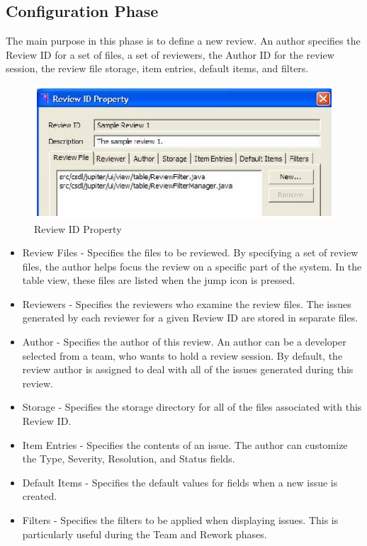 \subsection{Configuration Phase}
\label{subsec:configuration-phase}

The main purpose in this phase is to define a new review. An author specifies the Review ID for a set of files, a set of reviewers, the Author ID for the review session, the review file storage, item entries, default items, and filters.

\begin{figure}[htbp]
  \centering
  \includegraphics{images/fig3-1.eps}
  \caption{Review ID Property}
  \label{fig3-1}
\end{figure}

\begin{itemize}
	\item Review Files - Specifies the files to be reviewed. By specifying a set of review files, the author helps focus the review on a specific part of the system.  In the table view, these files are listed when the jump icon is pressed.
	\item Reviewers - Specifies the reviewers who examine the review files. The issues generated by each reviewer for a given Review ID are stored in separate files.
	\item Author - Specifies the author of this review. An author can be a developer selected from a team, who wants to hold a review session. By default, the review author is assigned to deal with all of the issues generated during this review.
	\item Storage - Specifies the storage directory for all of the files associated with this Review ID.
	\item Item Entries - Specifies the contents of an issue.  The author can customize the Type, Severity, Resolution, and Status fields.
	\item Default Items - Specifies the default values for fields when a new issue is created.
	\item Filters - Specifies the filters to be applied when displaying issues. This is particularly useful during the Team and Rework phases. 
\end{itemize}


